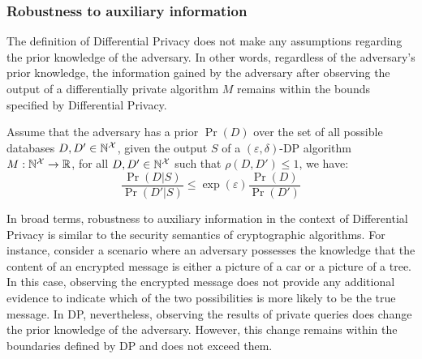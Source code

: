 \subsubsection{Robustness to auxiliary information}
\label{subsubsec:dp-auxiliary}
The definition of Differential Privacy does not make any assumptions regarding the prior knowledge of the adversary. 
In other words, regardless of the adversary's prior knowledge, the information gained by the adversary after observing the output of a differentially private algorithm $M$ remains within the bounds specified by Differential Privacy. 
\begin{proposition}
  \label{prop:auxiliary}
  Assume that the adversary has a prior $\Pr(D)$ over the set of all possible databases $D, D' \in \mathbb{N}^\mathcal{X}$, given the output $S$ of a $(\varepsilon, \delta)$-DP algorithm $M: \mathbb{N}^\mathcal{X} \rightarrow \mathbb{R}$, for all $D, D' \in \mathbb{N}^\mathcal{X}$ such that $\rho(D, D') \leq 1$, we have: 
  \begin{equation*}
    \frac{\Pr(D|S)}{\Pr(D'|S)} \leq \exp(\varepsilon) \frac{\Pr(D)}{\Pr(D')}
  \end{equation*}
\end{proposition}
In broad terms, robustness to auxiliary information in the context of Differential Privacy is similar to the security semantics of cryptographic algorithms. 
For instance, consider a scenario where an adversary possesses the knowledge that the content of an encrypted message is either a picture of a car or a picture of a tree.
In this case, observing the encrypted message does not provide any additional evidence to indicate which of the two possibilities is more likely to be the true message.
In DP, nevertheless, observing the results of private queries does change the prior knowledge of the adversary.
However, this change remains within the boundaries defined by DP and does not exceed them.

